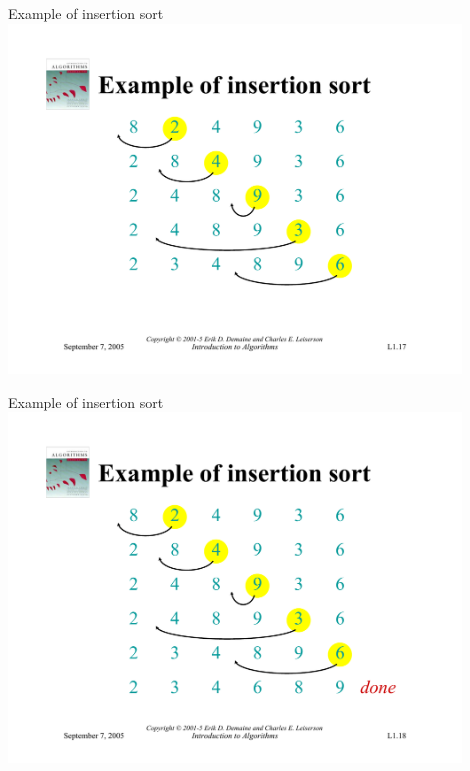 \documentclass{beamer}
\begin{document}
\begin{frame}{Example of insertion sort}
    \centering
    \includegraphics[width=0.9\textwidth, trim={5cm 2.95cm 5cm 4.25cm}, clip]{pages/lec1_17}
\end{frame}
\begin{frame}{Example of insertion sort}
    \centering
    \includegraphics[width=0.9\textwidth, trim={5cm 2.95cm 5cm 4.25cm}, clip]{pages/lec1_18}
\end{frame}
\end{document}
